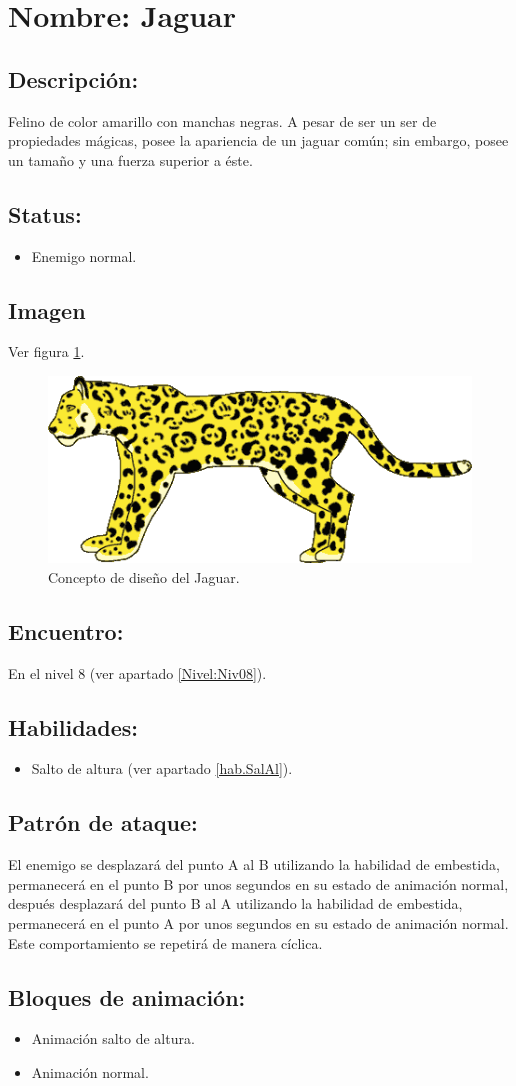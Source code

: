 \section{Nombre: Jaguar}   \label{per:jaguar}
\subsection{Descripción:}
Felino de color amarillo con manchas negras. A pesar de ser un ser de propiedades mágicas, posee la apariencia de un jaguar común; sin embargo, posee un tamaño y una fuerza superior a éste.
\subsection{Status:}
\begin{itemize}
	\item Enemigo normal.
\end{itemize}
\subsection{Imagen}
Ver figura \ref{fig:jaguar}.
\begin{figure}
	\centering
	\includegraphics[height=0.2 \textheight]{Imagenes/jaguar}
	\caption{Concepto de diseño del Jaguar.}
	\label{fig:jaguar}
\end{figure}
\subsection{Encuentro:}
En el nivel 8 (ver apartado \ref{Nivel:Niv08}).
\subsection{Habilidades:}
\begin{itemize}
	\item Salto de altura (ver apartado \ref{hab.SalAl}).
\end{itemize}
\subsection{Patrón de ataque:}
El enemigo se desplazará del punto A al B utilizando la habilidad de embestida, permanecerá en el punto B por unos segundos en su estado de animación normal, después desplazará del punto B al A utilizando la habilidad de embestida, permanecerá en el punto A por unos segundos en su estado de animación normal. Este comportamiento se repetirá de manera cíclica.
\subsection{Bloques de animación:}
	\begin{itemize}
		\item Animación salto de altura.
		\item Animación normal.
	\end{itemize}